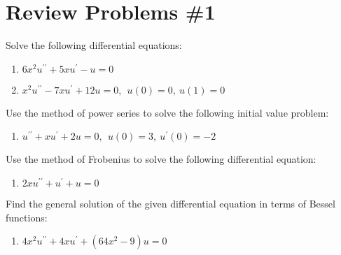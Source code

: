 \chapter{Review Problems \#1}
\label{ch:rev1}
\begin{fullwidth}
Solve the following differential equations:
\begin{enumerate}
\item $6x^2u^{\prime \prime} + 5xu^{\prime} - u  = 0$

\vspace{1.0cm}

\item $x^2u^{\prime \prime} -7xu^{\prime}+12u = 0, \ \ u(0)=0, \ u(1) = 0 $

\vspace{1.0cm}


\end{enumerate}

\noindent Use the method of power series to solve the following initial value problem:
\begin{enumerate}[resume]
\item $u^{\prime \prime} + xu^{\prime} + 2u = 0, \ \ u(0) = 3, \ u^{\prime}(0) = -2$

\vspace{1.0cm}

\end{enumerate}

\vspace{1.0cm}

\noindent Use the method of Frobenius to solve the following differential equation:
\begin{enumerate}[resume]
\item $2xu^{\prime \prime}+u^{\prime} + u = 0$

\vspace{1.0cm}

\end{enumerate}

\noindent Find the general solution of the given differential equation in terms of Bessel functions:

\begin{enumerate}[resume]
\item $4x^2u^{\prime \prime} + 4xu^{\prime} + \left(64x^2-9 \right)u = 0$

\end{enumerate}
\end{fullwidth}
